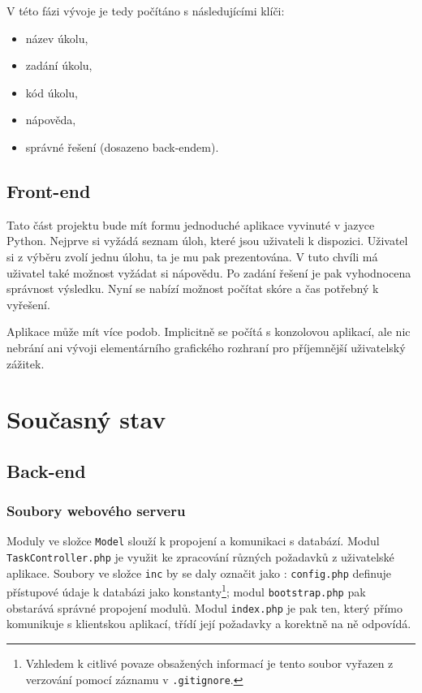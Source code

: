 \documentclass[titlepage]{article}
\begin{document}
V této fázi vývoje je tedy počítáno s následujícími klíči:
\begin{itemize}
    \item název úkolu,
    \item zadání úkolu,
    \item kód úkolu,
    \item nápověda,
    \item správné řešení (dosazeno back-endem).
\end{itemize}


\subsection{Front-end}
Tato část projektu bude mít formu jednoduché aplikace vyvinuté v jazyce Python. Nejprve si vyžádá seznam úloh, které jsou uživateli k dispozici. Uživatel si z výběru zvolí jednu úlohu, ta je mu pak prezentována. V tuto chvíli má uživatel také možnost vyžádat si nápovědu. Po zadání řešení je pak vyhodnocena správnost výsledku. Nyní se nabízí možnost počítat skóre a čas potřebný k vyřešení. 

Aplikace může mít více podob. Implicitně se počítá s konzolovou aplikací, ale nic nebrání ani vývoji elementárního grafického rozhraní pro příjemnější uživatelský zážitek. 



\section{Současný stav}
\subsection{Back-end}
\subsubsection{Soubory webového serveru}
\vspace{1em}
Moduly ve složce \texttt{Model} slouží k propojení a komunikaci s databází. Modul \texttt{Task\-Controller.php} je využit ke zpracování různých požadavků z uživatelské aplikace. Soubory ve složce \texttt{inc} by se daly označit jako : \texttt{config.php} definuje přístupové údaje k databázi jako konstanty\footnote{Vzhledem k citlivé povaze obsažených informací je tento soubor vyřazen z verzování pomocí záznamu v \texttt{.gitignore}.}; modul \texttt{boot\-strap.php} pak obstarává správné propojení modulů. Modul \texttt{index.php} je pak ten, který přímo komunikuje s klientskou aplikací, třídí její požadavky a korektně na ně odpovídá. 
\end{document}
